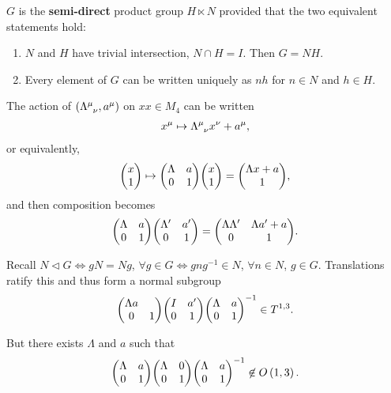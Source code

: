 
\begin{definition}
    $G$ is the \textbf{semi-direct} product group $H \ltimes N$ provided that the two equivalent statements hold:
    \begin{enumerate}[label=\roman*)]
        \item $N$ and $H$ have trivial intersection, $N \cap H = I$. Then $G = NH$.
        \item Every element of $G$ can be written uniquely as $nh$ for $n \in N$ and $h \in H$.
    \end{enumerate}
\end{definition}

The action of $\left( \tensor{\Lambda}{^{\mu}_\nu}, a^{\mu} \right) $ on $x x\in M_4$ can be written
\begin{align}
    x^{\mu} \mapsto \tensor{\Lambda}{^{\mu}_\nu} x^{\nu} + a^{\mu}
,\end{align}
or equivalently,
\begin{align}
    \mqty( x \\ 1 ) \mapsto \mqty( \Lambda & a \\ 0 & 1 ) \mqty( x \\ 1) = \mqty( \Lambda x + a \\ 1 )
,\end{align}
and then composition becomes
\begin{align}
    \mqty( \Lambda & a \\ 0 & 1 ) \mqty( \Lambda' & a' \\ 0 & 1 ) = \mqty( \Lambda \Lambda' & \Lambda a' + a \\ 0 & 1 )
.\end{align}

Recall $N \triangleleft G \iff g N = Ng$, $\forall g \in G \iff g n g^{-1} \in N$, $\forall n \in N$, $g \in G$. Translations ratify this and thus form a normal subgroup
\begin{align}
    \mqty( \Lambda a \\ 0 & 1 ) \mqty( I & a' \\ 0 & 1 ) \mqty( \Lambda & a \\ 0 & 1 )^{-1} \in T^{1,3}
.\end{align}

But there exists $\Lambda$ and $a$ such that
\begin{align}
    \mqty( \Lambda & a \\ 0 & 1 ) \mqty( \Lambda & 0 \\ 0 & 1 ) \mqty( \Lambda & a \\ 0 & 1)^{-1} \not\in O \left( 1,3 \right) 
.\end{align}

